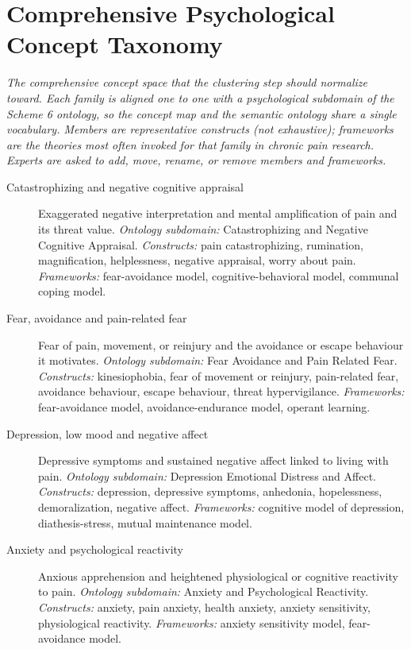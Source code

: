 \documentclass[11pt]{article}
\begin{document}
\section*{Comprehensive Psychological Concept Taxonomy}
{\small\itshape The comprehensive concept space that the clustering step should normalize toward. Each family is aligned one to one with a psychological subdomain of the Scheme 6 ontology, so the concept map and the semantic ontology share a single vocabulary. Members are representative constructs (not exhaustive); frameworks are the theories most often invoked for that family in chronic pain research. Experts are asked to add, move, rename, or remove members and frameworks.}\par\smallskip
\begin{description}
\item[Catastrophizing and negative cognitive appraisal] Exaggerated negative interpretation and mental amplification of pain and its threat value.
{\small \textit{Ontology subdomain:} Catastrophizing and Negative Cognitive Appraisal. \textit{Constructs:} pain catastrophizing, rumination, magnification, helplessness, negative appraisal, worry about pain. \textit{Frameworks:} fear-avoidance model, cognitive-behavioral model, communal coping model.}
\item[Fear, avoidance and pain-related fear] Fear of pain, movement, or reinjury and the avoidance or escape behaviour it motivates.
{\small \textit{Ontology subdomain:} Fear Avoidance and Pain Related Fear. \textit{Constructs:} kinesiophobia, fear of movement or reinjury, pain-related fear, avoidance behaviour, escape behaviour, threat hypervigilance. \textit{Frameworks:} fear-avoidance model, avoidance-endurance model, operant learning.}
\item[Depression, low mood and negative affect] Depressive symptoms and sustained negative affect linked to living with pain.
{\small \textit{Ontology subdomain:} Depression Emotional Distress and Affect. \textit{Constructs:} depression, depressive symptoms, anhedonia, hopelessness, demoralization, negative affect. \textit{Frameworks:} cognitive model of depression, diathesis-stress, mutual maintenance model.}
\item[Anxiety and psychological reactivity] Anxious apprehension and heightened physiological or cognitive reactivity to pain.
{\small \textit{Ontology subdomain:} Anxiety and Psychological Reactivity. \textit{Constructs:} anxiety, pain anxiety, health anxiety, anxiety sensitivity, physiological reactivity. \textit{Frameworks:} anxiety sensitivity model, fear-avoidance model.}

\end{description}
\end{document}
